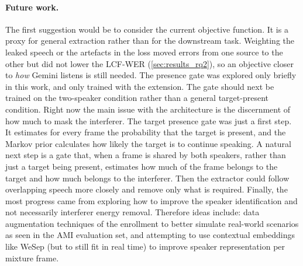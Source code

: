 \paragraph{Future work.}
 The first suggestion would be to consider the current objective function. It is a proxy for general extraction rather than for the downstream task. Weighting the leaked speech or the artefacts in the loss moved errors from one source to the other but did not lower the LCF-WER (\autoref{sec:results_rq2}), so an objective closer to \emph{how} Gemini listens is still needed. The presence gate was explored only briefly in this work, and only trained with the extension. The gate should next be trained on the two-speaker condition rather than a general target-present condition. Right now the main issue with the architecture is the discernment of how much to mask the interferer. The target presence gate was just a first step. It estimates for every frame the probability that the target is present, and the Markov prior calculates how likely the target is to continue speaking. A natural next step is a gate that, when a frame is shared by both speakers, rather than just a target being present, estimates how much of the frame belongs to the target and how much belongs to the interferer. Then the extractor could follow overlapping speech more closely and remove only what is required. Finally, the most progress came from exploring how to improve the speaker identification and not necessarily interferer energy removal. Therefore ideas include: data augmentation techniques of the enrollment to better simulate real-world scenarios as seen in the AMI evaluation set, and attempting to use contextual embeddings like WeSep (but to still fit in real time) to improve speaker representation per mixture frame.
